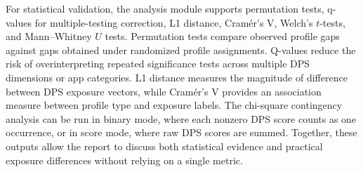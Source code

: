 For statistical validation, the analysis module supports permutation tests, q-values for multiple-testing correction, L1 distance, Cramér’s V, Welch's \(t\)-tests, and Mann--Whitney \(U\) tests. Permutation tests compare observed profile gaps against gaps obtained under randomized profile assignments. Q-values reduce the risk of overinterpreting repeated significance tests across multiple DPS dimensions or app categories. L1 distance measures the magnitude of difference between DPS exposure vectors, while Cramér’s V provides an association measure between profile type and exposure labels. The chi-square contingency analysis can be run in binary mode, where each nonzero DPS score counts as one occurrence, or in score mode, where raw DPS scores are summed. Together, these outputs allow the report to discuss both statistical evidence and practical exposure differences without relying on a single metric.
